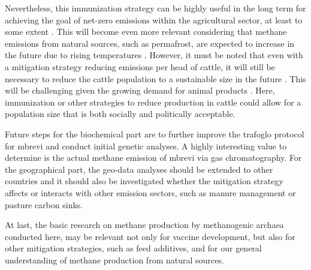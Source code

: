 Nevertheless, this immunization strategy can be highly useful in the long term for achieving the goal of net-zero emissions within the agricultural sector, at least to some extent  \parencite{unfcccParisAgreement2015}. This will become even more relevant considering that methane emissions from natural sources, such as permafrost, are expected to increase in the future due to rising temperatures \parencite{schadelPermafrostWildfireCarbon2026}. However, it must be noted that even with a mitigation strategy reducing emissions per head of cattle, it will still be necessary to reduce the cattle population to a sustainable size in the future \parencite{edelenboschReducingSectoralHardtoabate2024}. This will be challenging given the growing demand for animal products \parencite{faoLivestockBalance2009, appelhansUnterschatztesTreibhausgasMethan2025}. Here, immunization or other strategies to reduce  production in cattle could allow for a population size that is both socially and politically acceptable.

Future steps for the biochemical part are to further improve the \gls{trafoglo} protocol for \acrlong{mbrevi} and conduct initial genetic analyses. A highly interesting value to determine is the actual methane emission of \acrlong{mbrevi} via gas chromatography. For the geographical part, the geo-data analyses should be extended to other countries and it should also be investigated whether the mitigation strategy affects or interacts with other emission sectors, such as manure management or pasture carbon sinks.

At last, the basic research on methane production by methanogenic archaea conducted here, may be relevant not only for vaccine development, but also for other mitigation strategies, such as feed additives, and for our general understanding of methane production from natural sources.
